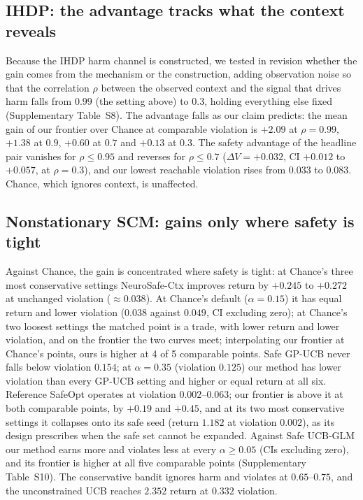 \documentclass[10pt,a4paper]{article}
\begin{document}
\subsection*{IHDP: the advantage tracks what the context reveals}
Because the IHDP harm channel is constructed, we tested in revision whether the gain comes from the mechanism or the construction, adding observation noise so that the correlation $\rho$ between the observed context and the signal that drives harm falls from $0.99$ (the setting above) to $0.3$, holding everything else fixed (Supplementary Table~S8). The advantage falls as our claim predicts: the mean gain of our frontier over Chance at comparable violation is $+2.09$ at $\rho=0.99$, $+1.38$ at $0.9$, $+0.60$ at $0.7$ and $+0.13$ at $0.3$. The safety advantage of the headline pair vanishes for $\rho\le0.95$ and reverses for $\rho\le0.7$ ($\Delta V=+0.032$, CI $+0.012$ to $+0.057$, at $\rho=0.3$), and our lowest reachable violation rises from $0.033$ to $0.083$. Chance, which ignores context, is unaffected.

\subsection*{Nonstationary SCM: gains only where safety is tight}
Against Chance, the gain is concentrated where safety is tight: at Chance's three most conservative
settings NeuroSafe-Ctx improves return by $+0.245$ to $+0.272$ at unchanged violation ($\approx0.038$).
At Chance's default ($\alpha=0.15$) it has equal return and lower violation ($0.038$ against $0.049$,
CI excluding zero); at Chance's two loosest settings the matched point is a trade, with lower return
and lower violation, and on the frontier the two curves meet; interpolating our frontier at Chance's
points, ours is higher at 4 of 5 comparable points. Safe GP-UCB never falls below violation $0.154$;
at $\alpha=0.35$ (violation $0.125$) our method has lower violation than every GP-UCB setting and higher
or equal return at all six. Reference SafeOpt operates at violation $0.002$--$0.063$; our frontier is
above it at both comparable points, by $+0.19$ and $+0.45$, and at its two most conservative settings it
collapses onto its safe seed (return $1.182$ at violation $0.002$), as its design prescribes when the
safe set cannot be expanded. Against Safe UCB-GLM our method earns more and violates less at every $\alpha\ge0.05$ (CIs excluding zero), and its frontier is higher at all five comparable points (Supplementary Table~S10). The conservative bandit ignores harm and violates at $0.65$--$0.75$, and
the unconstrained UCB reaches $2.352$ return at $0.332$ violation.
\end{document}
